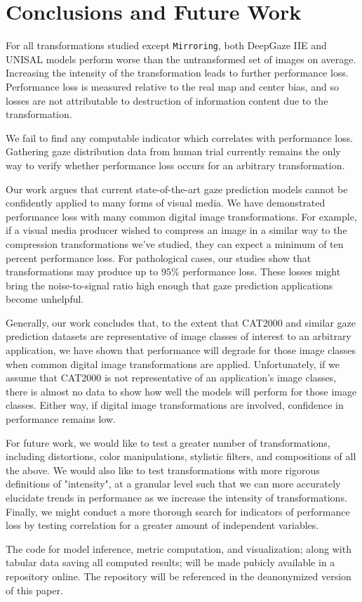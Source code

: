 \section{Conclusions and Future Work}
\label{sec:conclusion}

For all transformations studied except \verb|Mirroring|, both DeepGaze IIE \cite{deepgazeiie} and UNISAL \cite{unisal} models perform worse than the untransformed set of images on average. Increasing the intensity of the transformation leads to further performance loss. Performance loss is measured relative to the real map and center bias, and so losses are not attributable to destruction of information content due to the transformation.

We fail to find any computable indicator which correlates with performance loss. Gathering gaze distribution data from human trial currently remains the only way to verify whether performance loss occurs for an arbitrary transformation.

Our work argues that current state-of-the-art gaze prediction models cannot be confidently applied to many forms of visual media. We have demonstrated performance loss with many common digital image transformations. For example, if a visual media producer wished to compress an image in a similar way to the compression transformations we've studied, they can expect a minimum of ten percent performance loss. For pathological cases, our studies show that transformations may produce up to $95\%$ performance loss. These losses might bring the noise-to-signal ratio high enough that gaze prediction applications become unhelpful.

Generally, our work concludes that, to the extent that CAT2000 \cite{cat2000} and similar gaze prediction datasets are representative of image classes of interest to an arbitrary application, we have shown that performance will degrade for those image classes when common digital image transformations are applied. Unfortunately, if we assume that CAT2000 is not representative of an application's image classes, there is almost no data to show how well the models will perform for those image classes. Either way, if digital image transformations are involved, confidence in performance remains low.

For future work, we would like to test a greater number of transformations, including distortions, color manipulations, stylistic filters, and compositions of all the above. We would also like to test transformations with more rigorous definitions of "intensity", at a granular level such that we can more accurately elucidate trends in performance as we increase the intensity of transformations. Finally, we might conduct a more thorough search for indicators of performance loss by testing correlation for a greater amount of independent variables.

The code for model inference, metric computation, and visualization; along with tabular data saving all computed results; will be made pubicly available in a repository online. The repository will be referenced in the deanonymized version of this paper.